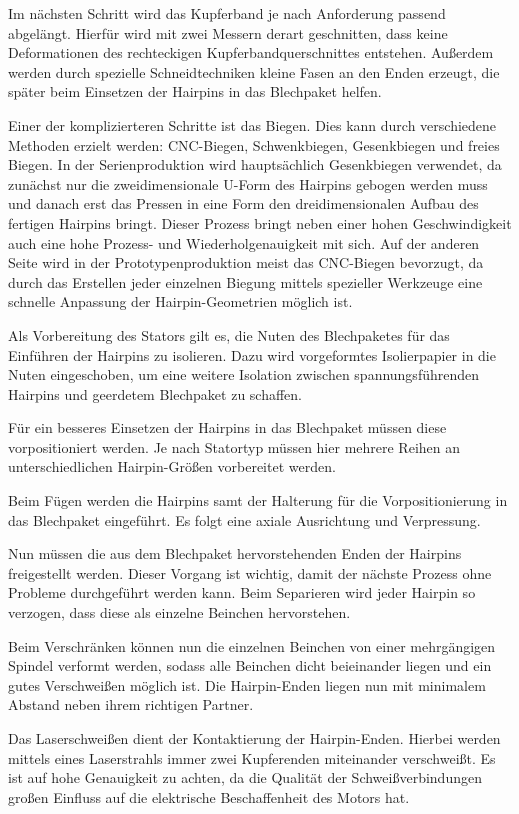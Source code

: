 Im nächsten Schritt wird das Kupferband je nach Anforderung passend abgelängt. Hierfür wird mit zwei Messern derart geschnitten, dass keine Deformationen
des rechteckigen Kupferbandquerschnittes entstehen. Außerdem werden durch spezielle Schneidtechniken kleine Fasen an den Enden erzeugt, die später beim Einsetzen der Hairpins in das Blechpaket helfen.

Einer der komplizierteren Schritte ist das Biegen. Dies kann durch verschiedene Methoden erzielt werden: CNC-Biegen, Schwenkbiegen, Gesenkbiegen und freies Biegen.
In der Serienproduktion wird hauptsächlich Gesenkbiegen verwendet, da zunächst nur die zweidimensionale U-Form des Hairpins gebogen werden muss und danach
erst das Pressen in eine Form den dreidimensionalen Aufbau des fertigen Hairpins bringt. Dieser Prozess bringt neben einer hohen Geschwindigkeit auch
eine hohe Prozess- und Wiederholgenauigkeit mit sich. Auf der anderen Seite wird in der Prototypenproduktion meist das CNC-Biegen bevorzugt, da durch das Erstellen
jeder einzelnen Biegung mittels spezieller Werkzeuge eine schnelle Anpassung der Hairpin-Geometrien möglich ist.

Als Vorbereitung des Stators gilt es, die Nuten des Blechpaketes für das Einführen der Hairpins zu isolieren.
Dazu wird vorgeformtes Isolierpapier in die Nuten eingeschoben, um eine weitere Isolation zwischen spannungsführenden Hairpins und geerdetem
Blechpaket zu schaffen.

Für ein besseres Einsetzen der Hairpins in das Blechpaket müssen diese vorpositioniert werden. Je nach Statortyp müssen hier
mehrere Reihen an unterschiedlichen Hairpin-Größen vorbereitet werden.

Beim Fügen werden die Hairpins samt der Halterung für die Vorpositionierung in das Blechpaket eingeführt.
Es folgt eine axiale Ausrichtung und Verpressung.

Nun müssen die aus dem Blechpaket hervorstehenden Enden der Hairpins freigestellt werden. Dieser Vorgang ist wichtig,
damit der nächste Prozess ohne Probleme durchgeführt werden kann. Beim Separieren wird jeder Hairpin so verzogen, dass diese als einzelne
Beinchen hervorstehen.

Beim Verschränken können nun die einzelnen Beinchen von einer mehrgängigen Spindel verformt werden, sodass alle Beinchen dicht beieinander liegen und
ein gutes Verschweißen möglich ist. Die Hairpin-Enden liegen nun mit minimalem Abstand neben ihrem richtigen Partner.

Das Laserschweißen dient der Kontaktierung der Hairpin-Enden. Hierbei werden mittels eines Laserstrahls immer zwei Kupferenden
miteinander verschweißt. Es ist auf hohe Genauigkeit zu achten, da die Qualität der Schweißverbindungen großen Einfluss auf
die elektrische Beschaffenheit des Motors hat.

